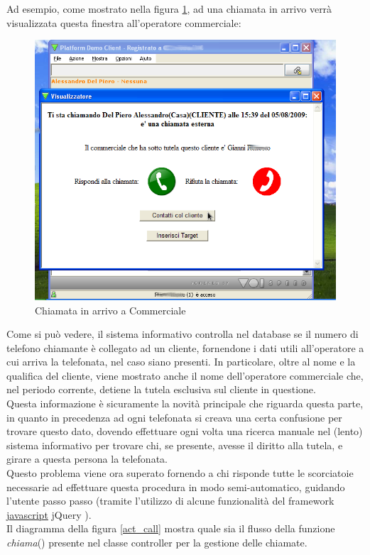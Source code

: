 \newpage
\noindent
Ad esempio, come mostrato nella figura \ref{chiamata_comm}, ad una chiamata in arrivo verr\`a visualizzata questa finestra all'operatore commerciale:

\begin{figure}[!ht]
\centering
  \includegraphics[scale=0.8]{./images/chiamata_commerciale.png}
\caption{Chiamata in arrivo a Commerciale}
\label{chiamata_comm}
\end{figure}

\noindent
Come si pu\`o vedere, il sistema informativo controlla nel database se il numero di telefono chiamante \`e collegato ad un cliente, fornendone i dati utili all'operatore a cui arriva la telefonata, nel caso siano presenti. In particolare, oltre al nome e la qualifica del cliente, viene mostrato anche il nome dell'operatore commerciale che, nel periodo corrente, detiene la tutela esclusiva sul cliente in questione. \\
Questa informazione \`e sicuramente la novit\`a principale che riguarda questa parte, in quanto in precedenza ad ogni telefonata si creava una certa confusione per trovare questo dato, dovendo effettuare ogni volta una ricerca manuale nel (lento) sistema informativo per trovare chi, se presente, avesse il diritto alla tutela, e girare a questa persona la telefonata. \\
Questo problema viene ora superato fornendo a chi risponde tutte le scorciatoie necessarie ad effettuare questa procedura in modo semi-automatico, guidando l'utente passo passo (tramite l'utilizzo di alcune funzionalit\`a del framework \hyperlink{javascript}{\underline{javascript}} jQuery \cite{jquery}). \\
Il diagramma della figura \ref{act_call} mostra quale sia il flusso della funzione \textit{chiama}() presente nel classe controller per la gestione delle chiamate. 

